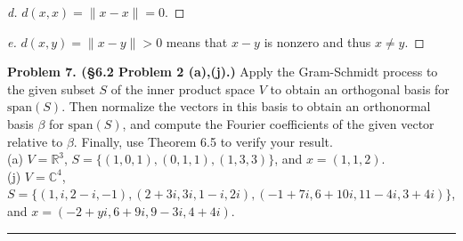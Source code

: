 \documentclass[leqno]{article}
\theoremstyle{nonumberplain}
\newtheorem{proof}{Proof}
\newcommand{\R}{\mathbb{R}}
\begin{document}
\begin{proof}[d]
$d(x,x)=\|x-x\|=0$.
\end{proof}

\begin{proof}[e]
$d(x,y)=\|x-y\|>0$ means that $x-y$ is nonzero and thus $x\neq y$.
\end{proof}

\pagebreak




\noindent\textbf{Problem 7. (\S 6.2 Problem 2 (a),(j).)} Apply the Gram-Schmidt process to the given subset $S$ of the inner product space $V$ to obtain an orthogonal basis for $\mathrm{span}(S)$. Then normalize the vectors in this basis to obtain an orthonormal basis $\beta$ for $\mathrm{span}(S)$, and compute the Fourier coefficients of the given vector relative to $\beta$. Finally, use Theorem 6.5 to verify your result.\\

(a) $V=\R^3$, $S=\{(1,0,1),(0,1,1),(1,3,3)\}$, and $x=(1,1,2)$.\\
\indent (j) $V=\mathbb{C}^4$, $S=\{(1,i,2-i,-1),(2+3i,3i,1-i,2i),(-1+7i,6+10i,11-4i,3+4i)\}$, and $x=(-2+yi,6+9i,9-3i,4+4i)$.

\noindent\rule[0.5ex]{\linewidth}{1pt}
\end{document}
